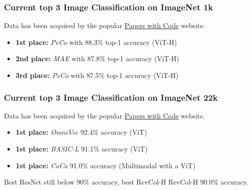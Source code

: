 \begin{frame}
\frametitle{Current top 3 Image Classification on ImageNet 1k}
Data has been acquired by the popular \href{https://paperswithcode.com/sota/image-classification-on-imagenet?tag_filter=171}{Papers with Code} website.


\begin{itemize}
    \item \textbf{1st place:} \textit{PeCo} with 88.3\% top-1 accuracy (ViT-H)
    \item \textbf{2nd place:} \textit{MAE} with 87.8\% top-1 accuracy (ViT-H)
    \item \textbf{3rd place:} \textit{PeCo} with 87.5\% top-1 accuracy (ViT-H)
\end{itemize}

\end{frame}

\begin{frame}
\frametitle{Current top 3 Image Classification on ImageNet 22k}
Data has been acquired by the popular \href{https://paperswithcode.com/sota/image-classification-on-imagenet}{Papers with Code} website.


\begin{itemize}
    \item \textbf{1st place:} \textit{OmniVec} 92.4\% accuracy (ViT)
    \item \textbf{1st place:} \textit{BASIC-L} 91.1\% accuracy (ViT)
    \item \textbf{1st place:} \textit{CoCa} 91.0\% accuracy (Multimodal with a ViT)
\end{itemize}

Best ResNet still below 90\% accuracy, best RevCol-H RevCol-H 90.0\% accuracy.

\end{frame}